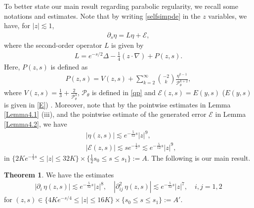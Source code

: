 \documentclass[11pt,reqno]{amsart}
\theoremstyle{definition}
\newtheorem{theorem}{Theorem}[section]
\theoremstyle{bfremark}
\numberwithin{equation}{section}
\begin{document}
To better state our main result regarding parabolic regularity, we recall some notations and estimates. Note that by writing \ref{selfsimpde} in the \(z\) variables, we have, for \(|z| \lesssim 1\),
    \begin{align}
    \label{eq:pde eta}
        \partial_s \eta= L \eta+\mathcal{E},
    \end{align}
    where the second-order operator \(L\) is given by 
    \begin{align}
    \label{def:mathcal P}
        L=e^{-s/2}\Delta-\frac{1}{4}(z \cdot \nabla)+P(z,s).
    \end{align}
    Here, \(P(z,s)\) is defined as 
    \begin{align*}
        P(z,s)=V(z,s)+\sum_{k=2}^{\infty}\binom{-2}{k}\frac{\eta^{k-1}}{\mathcal{P}_{\theta}^{k+2}},
    \end{align*}
    where \(V(z,s)=\frac{1}{3}+\frac{2}{\mathcal{P}_{\theta}^3}\), \(\mathcal{P}_{\theta}\) is defined in \ref{qp} and \(\mathcal{E}(z,s)=E(y,s)\) (\(E(y,s)\) is given in \ref{E}) . Moreover, note that by the pointwise estimates in Lemma \ref{Lemma4.1} (iii), and the pointwise estimate of the generated error \(\mathcal{E}\) in Lemma \ref{Lemma4.2}, we have
    \begin{align}
        &|\eta(z,s)| \lesssim e^{-\frac{5}{12}s}|z|^9, \label{inq app :pointwise eta}\\
        &|\mathcal{E}(z,s)| \lesssim se^{-\frac{1}{2}s}\lesssim e^{-\frac{5}{12}s}|z|^9, \label{inq app :pointwise E}
    \end{align}
    in \(\{2Ke^{-\frac{1}{4}s} \leq |z| \leq 32K\} \times \{\frac{1}{2}s_0 \leq s \leq s_1\}:=A\). The following is our main result.
    \begin{theorem}
    \label{thm:reg main}
        We have the estimates 
        \begin{align*}
            |\partial_i\,\eta(z,s)| \lesssim e^{-\frac{5}{12}s}|z|^8, \quad |\partial^2_{ij}\,\eta(z,s)| \lesssim e^{-\frac{5}{12}s}|z|^7, \quad i,j=1,2
        \end{align*}
        for \((z,s) \in \{4Ke^{-s/4} \leq |z| \leq 16K\} \times \{s_0 \leq s \leq s_1\}:=A'\).
    \end{theorem}
    
\end{document}
